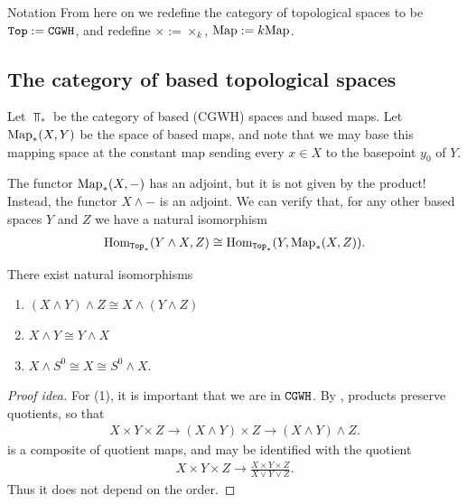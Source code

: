 \documentclass{article}[11pt]
\newcommand{\smashprod}{\wedge} %
\begin{document}
\begin{customenvironment}{Notation} From here on we redefine the category of topological spaces to be $\texttt{Top} := \texttt{CGWH}$, and redefine $\times := \times_k$, $\textup{Map} := k\textup{Map}$. 
\end{customenvironment}

\subsection{The category of based topological spaces}
Let $\Top_\ast$ be the category of based (CGWH) spaces and based maps. Let $\textup{Map}_\ast (X, Y)$ be the space of based maps, and  note that we may base this mapping space at the constant map sending every $x\in X$ to the basepoint $y_0$ of $Y$.

The functor $\textup{Map}_\ast (X, -)$ has an adjoint, but it is not given by the product! Instead, the functor $X\smashprod -$ is an adjoint. We can verify that, for any other based spaces $Y$ and $Z$ we have a natural isomorphism
\begin{align*}
	\Hom_{\Top_\ast} (Y\smashprod X, Z) \cong \Hom_{\Top_\ast} (Y, \Map_\ast (X,Z)).
\end{align*}

\begin{lemma} There exist natural isomorphisms
\begin{enumerate}
	\item $(X\smashprod Y) \smashprod Z \cong X\smashprod (Y\smashprod Z)$
	\item $X\smashprod Y \cong Y\smashprod X$
	\item $X\smashprod S^0 \cong X \cong S^0 \smashprod X$.
\end{enumerate}
\end{lemma}

\begin{proof}[Proof idea] For (1), it is important that we are in $\texttt{CGWH}$. By \cite[Proposition 2.20]{Strickland-cgwh}, products preserve quotients, so that 
\begin{align*}
	X\times Y \times Z \to (X\smashprod Y)\times Z \to (X\smashprod Y)\smashprod Z.
\end{align*}
is a composite of quotient maps, and may be identified with the quotient
\begin{align*}
	X\times Y \times Z \to \frac{X\times Y\times Z}{X\vee Y\vee Z}.
\end{align*}
Thus it does not depend on the order.

\end{proof}
\end{document}
